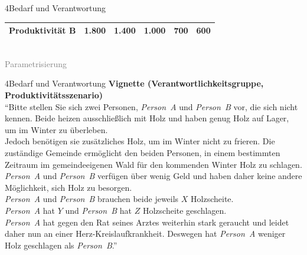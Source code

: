 \documentclass[xcolor=table,9pt,aspectratio=169]{beamer}
\begin{document}
\begin{frame}{\vspace*{10mm}4\hspace*{1em}Bedarf und Verantwortung}
\begin{center}
\begin{tabular}{lrrrrr}
      Produktivität B           &                  1.800    &                  1.400    &                  1.000    &                    700    &                    600    \\
      \hline
   \end{tabular}\\
   \smallskip
   \textcolor{gray}{Parametrisierung}
\end{center}
\end{frame}


\begin{frame}{\vspace*{10mm}4\hspace*{1em}Bedarf und Verantwortung}
\textbf{Vignette (Verantwortlichkeitsgruppe, Produktivitätsszenario)}\\
\medskip
\enquote{Bitte stellen Sie sich zwei Personen, \textit{Person~A} und \textit{Person~B} vor, die sich nicht kennen. Beide heizen ausschließlich mit Holz und haben genug Holz auf Lager, um im Winter zu überleben.\\
\medskip
Jedoch benötigen sie zusätzliches Holz, um im Winter nicht zu frieren. Die zuständige Gemeinde ermöglicht den beiden Personen, in einem bestimmten Zeitraum im gemeindeeigenen Wald für den kommenden Winter Holz zu schlagen. \textit{Person~A} und \textit{Person~B} verfügen über wenig Geld und haben daher keine andere Möglichkeit, sich Holz zu besorgen.\\
\medskip
\textit{Person~A} und \textit{Person~B} brauchen beide jeweils $X$ Holzscheite.\\
\medskip
\textit{Person~A} hat $Y$ und \textit{Person~B} hat $Z$ Holzscheite geschlagen.\\
\medskip
\textit{Person~A} hat gegen den Rat seines Arztes weiterhin stark geraucht und leidet daher nun an einer Herz-Kreislaufkrankheit. Deswegen hat \textit{Person~A} weniger Holz geschlagen als \textit{Person~B}.}
\end{frame}
\end{document}
